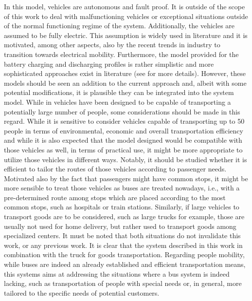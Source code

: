 In this model, vehicles are autonomous and fault proof. It is outside of the scope of this work to deal with malfunctioning vehicles or exceptional situations outside of the normal functioning regime of the system. Additionally, the vehicles are assumed to be fully electric. This assumption is widely used in literature and it is motivated, among other aspects, also by the recent trends in industry to transition towards electrical mobility. Furthermore, the model provided for the battery charging and discharging profiles is rather simplistic and more sophisticated approaches exist in literature (see  for more details). However, these models should be seen an addition to the current approach and, albeit with some potential modifications, it is plausible they can be integrated into the system model. While in \cite{project_thesis} vehicles have been designed to be capable of transporting a potentially large number of people, some considerations should be made in this regard. While it is sensitive to consider vehicles capable of transporting up to 50 people in terms of environmental, economic and overall transportation efficiency and while it is also expected that the model designed would be compatible with those vehicles as well, in terms of practical use, it might be more appropriate to utilize those vehicles in different ways. Notably, it should be studied whether it is efficient to tailor the routes of those vehicles according to passenger needs. Motivated also by the fact that passengers might have common stops, it might be more sensible to treat those vehicles as buses are treated nowadays, i.e., with a pre-determined route among stops which are placed according to the most common stops, such as hospitals or train stations. Similarly, if large vehicles to transport goods are to be considered, such as large trucks for example, those are usually not used for home delivery, but rather used to transport goods among specialized centers. It must be noted that both situations do not invalidate this work, or any previous work. It is clear that the system described in this work in combination with the truck for goods transportation. Regarding people mobility, while buses are indeed an already established and efficient transportation means, this systems aims at addressing the situations where a bus system is indeed lacking, such as transportation of people with special needs or, in general, more tailored to the specific needs of potential customers. \\
